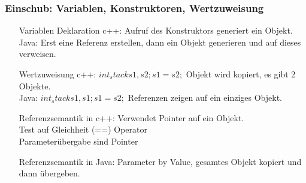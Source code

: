 \documentclass[a4paper]{article}
\begin{document}
\subsubsection*{Einschub: Variablen, Konstruktoren, Wertzuweisung}
\begin{itemize}
\item[Variablen Deklaration] c++: Aufruf des Konstruktors generiert ein Objekt.\\
	Java: Erst eine Referenz erstellen, dann ein Objekt generieren und auf dieses verweisen.
\item[Wertzuweisung] c++: $int_stack s1,s2; s1=s2;$ Objekt wird kopiert, es gibt 2 Objekte.\\
	Java: $int_stack s1,s1; s1=s2;$ Referenzen zeigen auf ein einziges Objekt.
\item[Referenzsemantik in c++:] Verwendet Pointer auf ein Objekt.\\
	Test auf Gleichheit (==) Operator\\
	Parameterübergabe sind Pointer
\item[Referenzsemantik in Java:] Parameter by Value, gesamtes Objekt kopiert und dann übergeben.
\end{itemize}
\end{document}
